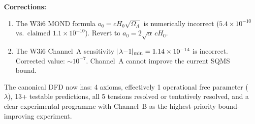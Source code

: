 \documentclass[11pt]{article}
\newcommand{\ee}[1]{\times 10^{#1}}
\newcommand{\aM}{a_0}
\newcommand{\Hzero}{H_0}
\newcommand{\lamdiff}{|\lambda{-}1|}
\begin{document}
\textbf{Corrections:}
\begin{enumerate}[nosep]
\item The W3i6 MOND formula $\aM = c\Hzero\sqrt{\Omega_\Lambda}$ is
  numerically incorrect ($5.4\ee{-10}$ vs.\ claimed $1.1\ee{-10}$).
  Revert to $\aM = 2\sqrt{\alpha}\,c\Hzero$.
\item The W3i6 Channel~A sensitivity $\lamdiff_{\rm min} = 1.14\ee{-14}$
  is incorrect. Corrected value: $\sim 10^{-7}$. Channel~A cannot
  improve the current SQMS bound.
\end{enumerate}

The canonical DFD now has: 4 axioms, effectively 1 operational free
parameter ($\lambda$), 13+ testable predictions, all 5 tensions
resolved or tentatively resolved, and a clear experimental programme
with Channel~B as the highest-priority bound-improving experiment.
\end{document}
